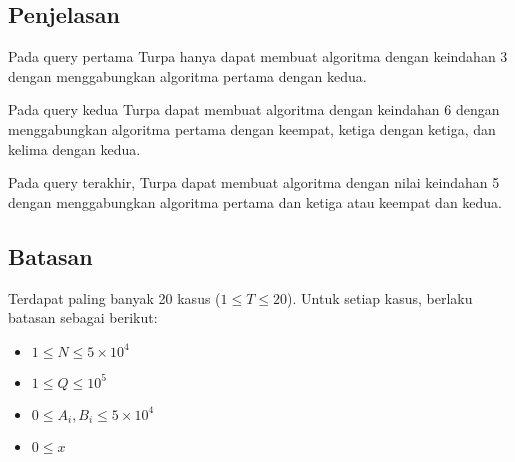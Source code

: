 \documentclass{article}
\begin{document}
\subsection*{Penjelasan}

\par Pada query pertama Turpa hanya dapat membuat algoritma dengan keindahan 3 dengan menggabungkan algoritma pertama dengan kedua.
\par Pada query kedua Turpa dapat membuat algoritma dengan keindahan 6 dengan menggabungkan algoritma pertama dengan keempat, ketiga dengan ketiga, dan kelima dengan kedua.
\par Pada query terakhir, Turpa dapat membuat algoritma dengan nilai keindahan 5 dengan menggabungkan algoritma pertama dan ketiga atau keempat dan kedua.

\subsection*{Batasan}

\par Terdapat paling banyak 20 kasus ($1 \leq T \leq 20$). Untuk setiap kasus, berlaku batasan sebagai berikut:
\begin{itemize}
	\item $1 \leq N \leq 5\times 10^4$
	\item $1 \leq Q \leq 10^5$
	\item $0 \leq A_i,B_i \leq 5\times 10^4$
	\item $0 \leq x$
\end{itemize}
\end{document}
